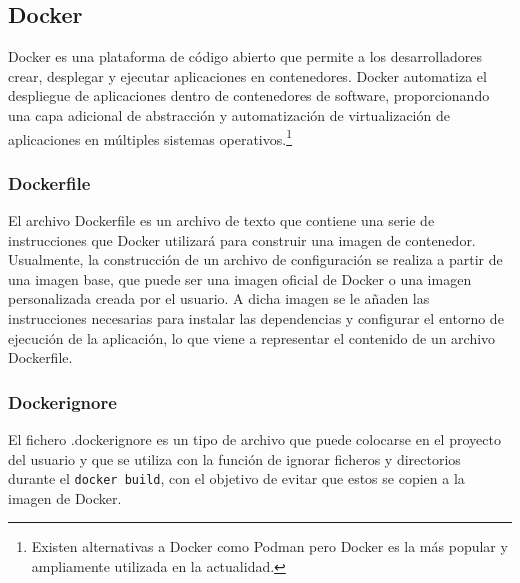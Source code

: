 \documentclass[12pt, a4paper, twoside]{article}
\begin{document}
\subsection{Docker}
\label{sec:Docker}
Docker \cite{docker} es una plataforma de código abierto que permite a los desarrolladores crear, desplegar y ejecutar aplicaciones en contenedores. Docker automatiza el despliegue de aplicaciones dentro de contenedores de software, proporcionando una capa adicional de abstracción y automatización de virtualización de aplicaciones en múltiples sistemas operativos.\footnote{Existen alternativas a Docker como Podman \cite{podman} pero Docker es la más popular y ampliamente utilizada en la actualidad.}
\subsubsection{Dockerfile}
\label{sec:Dockerfile}
El archivo Dockerfile \cite{Dockerfile_concepts} es un archivo de texto que contiene una serie de instrucciones que Docker utilizará para construir una imagen de contenedor.
Usualmente, la construcción de un archivo de configuración se realiza a partir de una imagen base, que puede ser una imagen oficial de Docker o una imagen personalizada creada por el usuario.
A dicha imagen se le añaden las instrucciones necesarias para instalar las dependencias y configurar el entorno de ejecución de la aplicación, lo que viene a representar el contenido de un archivo Dockerfile.
\subsubsection{Dockerignore}
\label{sec:dockerignore}
El fichero .dockerignore \cite{dockerignore} es un tipo de archivo que puede colocarse en el proyecto del usuario y que se utiliza con la función de ignorar ficheros y directorios durante el \texttt{docker build}, con el objetivo de evitar que estos se copien a la imagen de Docker.
\newpage
\end{document}
